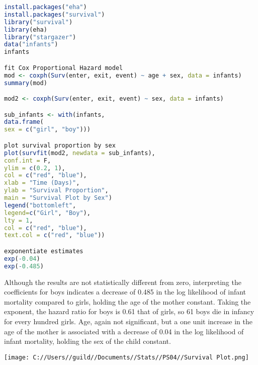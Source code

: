\documentclass[12pt,letterpaper]{article}
\begin{document}
\begin{lstlisting}[language=R]
install.packages("eha")
install.packages("survival")
library("survival")
library(eha)
library("stargazer")
data("infants")
infants

fit Cox Proportional Hazard model
mod <- coxph(Surv(enter, exit, event) ~ age + sex, data = infants)
summary(mod)

mod2 <- coxph(Surv(enter, exit, event) ~ sex, data = infants)

sub_infants <- with(infants, 
data.frame(
sex = c("girl", "boy")))

plot survival proportion by sex
plot(survfit(mod2, newdata = sub_infants),
conf.int = F,
ylim = c(0.2, 1),
col = c("red", "blue"),
xlab = "Time (Days)",
ylab = "Survival Proportion",
main = "Survival Plot by Sex")
legend("bottomleft",
legend=c("Girl", "Boy"),
lty = 1, 
col = c("red", "blue"),
text.col = c("red", "blue"))

exponentiate estimates
exp(-0.04)
exp(-0.485)	
\end{lstlisting}
Although the results are not statistically different from zero, interpreting the
coefficients for boys indicates a decrease of 0.485 in the log likelihood of infant
mortality compared to girls, holding the age of the mother constant. Taking the 
exponent, the hazard ratio for boys is 0.61 that of girls, so 61 boys die in infancy
for every hundred girls.
Age, again not significant, but a one unit increase in the age of the mother is 
associated with a decrease of 0.04 in the log likelihood of infant mortality, 
holding the sex of the child constant.

\texttt{[image: C://Users//guild//Documents//Stats//PS04//Survival Plot.png]}
\end{document}

